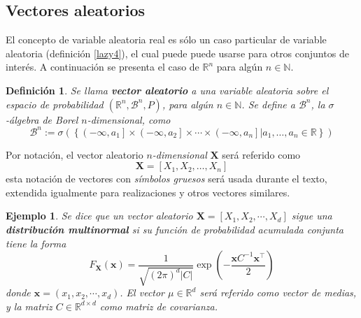 \documentclass[12pt,letterpaper]{book}
\newtheorem{definicion}{Definición}[chapter]
\newtheorem{ejemplo}{Ejemplo}[chapter]
\newcommand{\R}{\mathbb{R}}
\newcommand{\N}{\mathbb{N}}
\newcommand{\abso}[1]{\left| #1 \right|}
\begin{document}

\subsection{Vectores aleatorios}

El concepto de variable aleatoria real es sólo un caso particular de variable aleatoria (definición \ref{lazy4}), el cual puede puede usarse para otros conjuntos de interés.
%
A continuación se presenta el caso de $\R^{n}$ para algún $n\in \N$.

\begin{definicion}
Se llama \textbf{vector aleatorio} a una variable aleatoria sobre el espacio de probabilidad $(\R^{n},\mathcal{B}^{n},P)$, para algún $n\in \N$. Se define a $\mathcal{B}^{n}$, la $\sigma$-álgebra de Borel $n$-dimensional, como
\begin{equation}
\mathcal{B}^{n} := \sigma\left(\left\{ \left(-\infty, a_1\right]\times \left(-\infty, a_2\right]\times \cdots \times \left(-\infty, a_n\right] \lvert a_1, \dots, a_n \in \R \right\}\right)
\end{equation}
\end{definicion}

Por notación, el vector aleatorio \textit{$n$-dimensional} $\boldsymbol{X}$ será referido como
\begin{equation}
\boldsymbol{X} = [X_1, X_2, \dots, X_n]
\end{equation}
esta notación de vectores con \textit{símbolos gruesos} será usada durante el texto, extendida igualmente para realizaciones y otros vectores similares.

\begin{ejemplo}
Se dice que un vector aleatorio $\boldsymbol{X} = [X_1, X_2, \cdots, X_d]$ sigue una \textbf{distribución multinormal} si su función de probabilidad acumulada conjunta tiene la forma
\begin{equation}
F_{\boldsymbol{X}}\left( \boldsymbol{x} \right) = \frac{1}{\sqrt{(2\pi)^{d}\abso{C}}} \exp\left( -\frac{\boldsymbol{x} C^{-1} \boldsymbol{x}^{\intercal} }{2} \right)
\end{equation}
donde $\boldsymbol{x} = (x_1, x_2, \cdots, x_d)$. El vector $\mu \in \R^{d}$ será referido como \textit{vector de medias}, y la matriz $C \in \R^{d\times d}$ como \textit{matriz de covarianza}.
\end{ejemplo}
\end{document}
